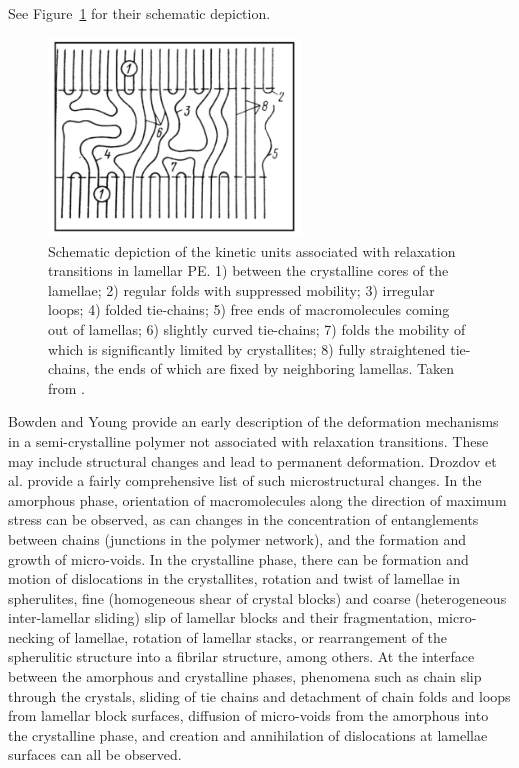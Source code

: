 See Figure~\ref{fig:kinetic_units_relax_scp} for their schematic depiction.
\begin{figure}[hbtp]
    \centering
    \includegraphics[width=0.6\textwidth]{figures/kinetic_units_scp}
    \caption{Schematic depiction of the kinetic units associated with relaxation transitions in lamellar PE. 1) between the crystalline cores of the lamellae; 2) regular folds with suppressed mobility; 3) irregular loops; 4) folded tie-chains; 5) free ends of macromolecules coming out of lamellas; 6) slightly curved tie-chains; 7) folds the mobility of which is significantly limited by crystallites; 8) fully straightened tie-chains, the ends of which are fixed by neighboring lamellas. Taken from \cite{arzhakovRelaxationPhysicalMechanical2019}.}
\label{fig:kinetic_units_relax_scp}
\end{figure}

Bowden and Young \citep{bowdenDeformationMechanismsCrystalline1974} provide an early description of the deformation mechanisms in a semi-crystalline polymer not associated with relaxation transitions.
These may include structural changes and lead to permanent deformation.
Drozdov et al. \citep{drozdovViscoelasticityViscoplasticityCreep2009} provide a fairly comprehensive list of such microstructural changes.
In the amorphous phase, orientation of macromolecules along the direction of maximum stress can be observed, as can changes in the concentration of entanglements between chains (junctions in the polymer network), and the formation and growth of micro-voids.
In the crystalline phase, there can be formation and motion of dislocations in the crystallites, rotation and twist of lamellae in spherulites, fine (homogeneous shear of crystal blocks) and coarse (heterogeneous inter-lamellar sliding) slip of lamellar blocks and their fragmentation, micro-necking of lamellae, rotation of lamellar stacks, or rearrangement of the spherulitic structure into a fibrilar structure, among others.
At the interface between the amorphous and crystalline phases, phenomena such as chain slip through the crystals, sliding of tie chains and detachment of chain folds and loops from lamellar block surfaces, diffusion of micro-voids from the amorphous into the crystalline phase, and creation and annihilation of dislocations at lamellae surfaces can all be observed.

